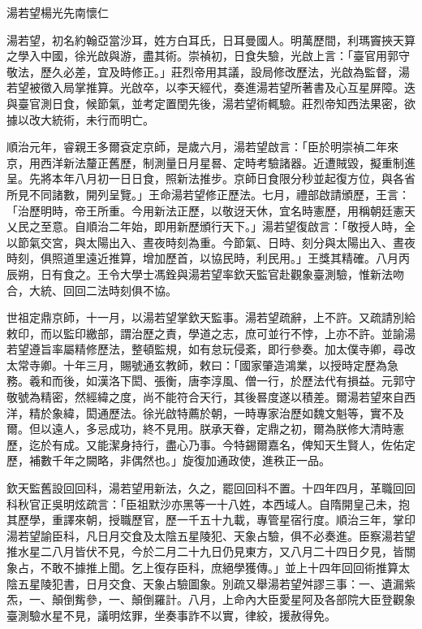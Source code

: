 
\begin{pinyinscope}
湯若望楊光先南懷仁

湯若望，初名約翰亞當沙耳，姓方白耳氏，日耳曼國人。明萬歷間，利瑪竇挾天算之學入中國，徐光啟與游，盡其術。崇禎初，日食失驗，光啟上言：「臺官用郭守敬法，歷久必差，宜及時修正。」莊烈帝用其議，設局修改歷法，光啟為監督，湯若望被徵入局掌推算。光啟卒，以李天經代，奏進湯若望所著書及心互星屏障。迭與臺官測日食，候節氣，並考定置閏先後，湯若望術輒驗。莊烈帝知西法果密，欲據以改大統術，未行而明亡。

順治元年，睿親王多爾袞定京師，是歲六月，湯若望啟言：「臣於明崇禎二年來京，用西洋新法釐正舊歷，制測量日月星晷、定時考驗諸器。近遭賊毀，擬重制進呈。先將本年八月初一日日食，照新法推步。京師日食限分秒並起復方位，與各省所見不同諸數，開列呈覽。」王命湯若望修正歷法。七月，禮部啟請頒歷，王言：「治歷明時，帝王所重。今用新法正歷，以敬迓天休，宜名時憲歷，用稱朝廷憲天乂民之至意。自順治二年始，即用新歷頒行天下。」湯若望復啟言：「敬授人時，全以節氣交宮，與太陽出入、晝夜時刻為重。今節氣、日時、刻分與太陽出入、晝夜時刻，俱照道里遠近推算，增加歷首，以協民時，利民用。」王獎其精確。八月丙辰朔，日有食之。王令大學士馮銓與湯若望率欽天監官赴觀象臺測驗，惟新法吻合，大統、回回二法時刻俱不協。

世祖定鼎京師，十一月，以湯若望掌欽天監事。湯若望疏辭，上不許。又疏請別給敕印，而以監印繳部，謂治歷之責，學道之志，庶可並行不悖，上亦不許。並諭湯若望遵旨率屬精修歷法，整頓監規，如有怠玩侵紊，即行參奏。加太僕寺卿，尋改太常寺卿。十年三月，賜號通玄教師，敕曰：「國家肇造鴻業，以授時定歷為急務。羲和而後，如漢洛下閎、張衡，唐李淳風、僧一行，於歷法代有損益。元郭守敬號為精密，然經緯之度，尚不能符合天行，其後晷度遂以積差。爾湯若望來自西洋，精於象緯，閎通歷法。徐光啟特薦於朝，一時專家治歷如魏文魁等，實不及爾。但以遠人，多忌成功，終不見用。朕承天眷，定鼎之初，爾為朕修大清時憲歷，迄於有成。又能潔身持行，盡心乃事。今特錫爾嘉名，俾知天生賢人，佐佑定歷，補數千年之闕略，非偶然也。」旋復加通政使，進秩正一品。

欽天監舊設回回科，湯若望用新法，久之，罷回回科不置。十四年四月，革職回回科秋官正吳明炫疏言：「臣祖默沙亦黑等一十八姓，本西域人。自隋開皇己未，抱其歷學，重譯來朝，授職歷官，歷一千五十九載，專管星宿行度。順治三年，掌印湯若望諭臣科，凡日月交食及太陰五星陵犯、天象占驗，俱不必奏進。臣察湯若望推水星二八月皆伏不見，今於二月二十九日仍見東方，又八月二十四日夕見，皆關象占，不敢不據推上聞。乞上復存臣科，庶絕學獲傳。」並上十四年回回術推算太陰五星陵犯書，日月交食、天象占驗圖象。別疏又舉湯若望舛謬三事：一、遺漏紫炁，一、顛倒觜參，一、顛倒羅計。八月，上命內大臣愛星阿及各部院大臣登觀象臺測驗水星不見，議明炫罪，坐奏事詐不以實，律絞，援赦得免。


\end{pinyinscope}
